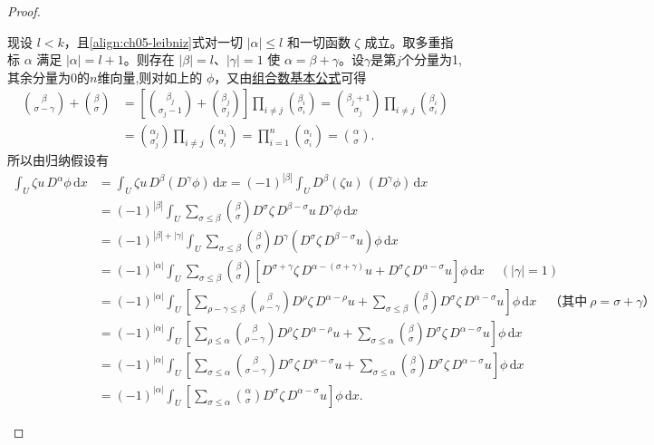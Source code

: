\documentclass[../../main.tex]{subfiles}
\begin{document}
\begin{proof}
\begin{enumerate}[(1)]
现设 $l<k$，且\eqref{align:ch05-leibniz}式对一切 $|\alpha|\leqslant l$ 和一切函数 $\zeta$ 成立。取多重指标 $\alpha$ 满足 $|\alpha|=l+1$。则存在 $|\beta|=l$、$|\gamma|=1$ 使 $\alpha=\beta+\gamma$。设$\gamma$是第$j$个分量为1,其余分量为0的$n$维向量,则对如上的 $\phi$，又由\hyperref[Basis of Analytics-proposition:组合数基本性质]{组合数基本公式}可得
\begin{align*}
\binom{\beta}{\sigma -\gamma}+\binom{\beta}{\sigma}&=\left[ \binom{\beta _j}{\sigma _j-1}+\binom{\beta _j}{\sigma _j} \right] \prod_{i\ne j}{\binom{\beta _i}{\sigma _i}}=\binom{\beta _j+1}{\sigma _j}\prod_{i\ne j}{\binom{\beta _i}{\sigma _i}}
\\
&=\binom{\alpha _j}{\sigma _j}\prod_{i\ne j}{\binom{\alpha _i}{\sigma _i}}=\prod_{i=1}^n{\binom{\alpha _i}{\sigma _i}}=\binom{\alpha}{\sigma}.
\end{align*}
所以由归纳假设有
\begin{align*}
\int_{U}\zeta u\,D^{\alpha}\phi\,\mathrm{d}x
&=\int_U{\zeta u\,D^{\beta}\left( D^{\gamma}\phi \right) \,\mathrm{d}x}=\left( -1 \right) ^{\left| \beta \right|}\int_U{D^{\beta}\left( \zeta u \right) \,\left( D^{\gamma}\phi \right) \,\mathrm{d}x}\\
&=(-1)^{|\beta|}\int_{U}\sum_{\sigma\leqslant\beta}\binom{\beta}{\sigma}D^{\sigma}\zeta\,D^{\beta-\sigma}u\,D^{\gamma}\phi\,\mathrm{d}x
\\
&=(-1)^{|\beta|+|\gamma|}\int_{U}\sum_{\sigma\leqslant\beta}\binom{\beta}{\sigma}D^{\gamma}(D^{\sigma}\zeta\,D^{\beta-\sigma}u)\phi\,\mathrm{d}x
\\
&=\left( -1 \right) ^{|\alpha |}\int_U{\sum_{\sigma \leqslant \beta}{\binom{\beta}{\sigma}\left[ D^{\sigma +\gamma}\zeta \,D^{\alpha -\left( \sigma +\gamma \right)}u+D^{\sigma}\zeta \,D^{\alpha -\sigma}u \right] \phi \,\mathrm{d}x}}\quad\ (|\gamma|=1)
\\
&=\left( -1 \right) ^{|\alpha |}\int_U{\left[ \sum_{\rho -\gamma \leqslant \beta}{\binom{\beta}{\rho -\gamma}D^{\rho}\zeta \,D^{\alpha -\rho}u}+\sum_{\sigma \leqslant \beta}{\binom{\beta}{\sigma}D^{\sigma}\zeta \,D^{\alpha -\sigma}u} \right] \phi \,\mathrm{d}x}\quad\text{（其中}\ \rho=\sigma+\gamma\text{）}
\\
&=\left( -1 \right) ^{|\alpha |}\int_U{\left[ \sum_{\rho \leqslant \alpha}{\binom{\beta}{\rho -\gamma}D^{\rho}\zeta \,D^{\alpha -\rho}u}+\sum_{\sigma \leqslant \alpha}{\binom{\beta}{\sigma}D^{\sigma}\zeta \,D^{\alpha -\sigma}u} \right] \phi \,\mathrm{d}x}
\\
&=\left( -1 \right) ^{|\alpha |}\int_U{\left[ \sum_{\sigma \leqslant \alpha}{\binom{\beta}{\sigma -\gamma}D^{\sigma}\zeta \,D^{\alpha -\sigma}u}+\sum_{\sigma \leqslant \alpha}{\binom{\beta}{\sigma}D^{\sigma}\zeta \,D^{\alpha -\sigma}u} \right] \phi \,\mathrm{d}x}
\\
&=\left( -1 \right) ^{|\alpha |}\int_U{\left[ \sum_{\sigma \leqslant \alpha}{\binom{\alpha}{\sigma}D^{\sigma}\zeta \,D^{\alpha -\sigma}u} \right] \phi \,\mathrm{d}x}.
\end{align*}
\end{enumerate}
\end{proof}
\end{document}
